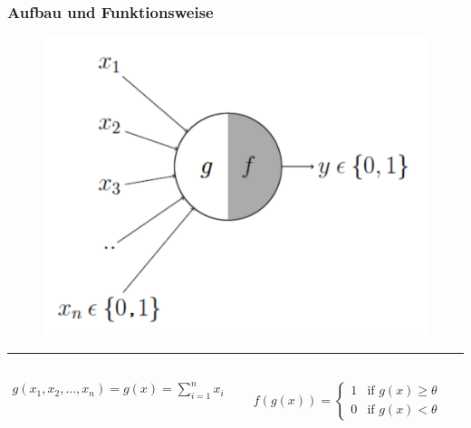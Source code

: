 \begin{frame}
\frametitle{Aufbau und Funktionsweise}
\begin{figure}
	\includegraphics[width=.5\linewidth]{./geschichtliches/mcCullochPittsNeuron/img/aufbau_alpha}
\end{figure}

\hrule

\begin{columns}

\begin{align*}
g(x_1, x_2, \dots , x_n) = g(x) = \sum_{i=1}^n x_i
\end{align*}

\begin{align*} \label{eq:aktFkt2}
f(g(x)) =\begin{cases}
	1 & \mbox{if } g(x) \geq \theta \\
    0 & \mbox{if } g(x) < \theta
  \end{cases}
\end{align*}
\end{columns}



\end{frame}


